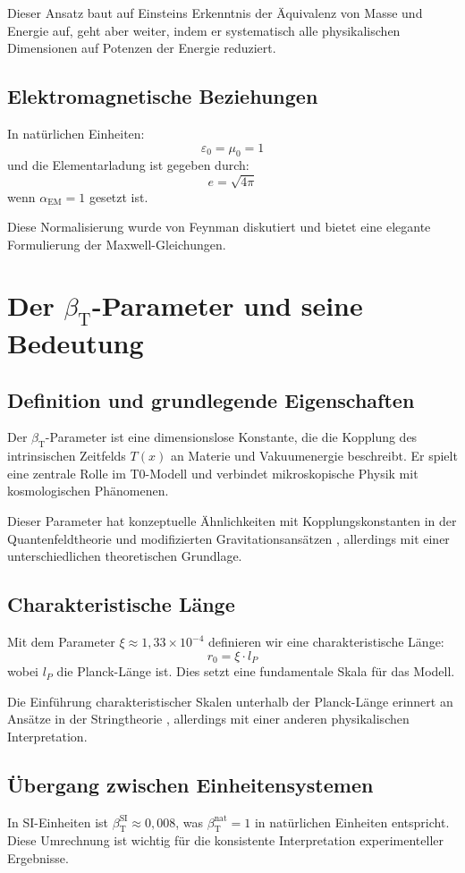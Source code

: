 \documentclass[a4paper,12pt]{article}
\newcommand{\Tfield}{T(x)}
\newcommand{\betaT}{\beta_{\text{T}}}
\newcommand{\alphaEM}{\alpha_{\text{EM}}}
\begin{document}
	Dieser Ansatz baut auf Einsteins Erkenntnis der Äquivalenz von Masse und Energie \cite{Einstein1905b} auf, geht aber weiter, indem er systematisch alle physikalischen Dimensionen auf Potenzen der Energie reduziert.
	
	\subsection{Elektromagnetische Beziehungen}
	In natürlichen Einheiten:
	\[
	\varepsilon_0 = \mu_0 = 1
	\]
	und die Elementarladung ist gegeben durch:
	\[
	e = \sqrt{4\pi}
	\]
	wenn $\alphaEM = 1$ gesetzt ist.
	
	Diese Normalisierung wurde von Feynman \cite{Feynman1985} diskutiert und bietet eine elegante Formulierung der Maxwell-Gleichungen.
	
	\section{Der $\betaT$-Parameter und seine Bedeutung}
	
	\subsection{Definition und grundlegende Eigenschaften}
	Der $\betaT$-Parameter ist eine dimensionslose Konstante, die die Kopplung des intrinsischen Zeitfelds $\Tfield$ an Materie und Vakuumenergie beschreibt. Er spielt eine zentrale Rolle im T0-Modell und verbindet mikroskopische Physik mit kosmologischen Phänomenen.
	
	Dieser Parameter hat konzeptuelle Ähnlichkeiten mit Kopplungskonstanten in der Quantenfeldtheorie und modifizierten Gravitationsansätzen \cite{Clifton2012}, allerdings mit einer unterschiedlichen theoretischen Grundlage.
	
	\subsection{Charakteristische Länge}
	Mit dem Parameter $\xi \approx 1,33 \times 10^{-4}$ definieren wir eine charakteristische Länge:
	\[
	r_0 = \xi \cdot l_P
	\]
	wobei $l_P$ die Planck-Länge ist. Dies setzt eine fundamentale Skala für das Modell.
	
	Die Einführung charakteristischer Skalen unterhalb der Planck-Länge erinnert an Ansätze in der Stringtheorie \cite{Polchinski1998}, allerdings mit einer anderen physikalischen Interpretation.
	
	\subsection{Übergang zwischen Einheitensystemen}
	In SI-Einheiten ist $\betaT^{\text{SI}} \approx 0,008$, was $\betaT^{\text{nat}} = 1$ in natürlichen Einheiten entspricht. Diese Umrechnung ist wichtig für die konsistente Interpretation experimenteller Ergebnisse.
	
\end{document}
